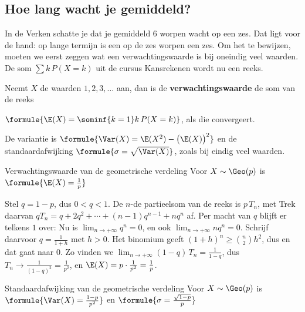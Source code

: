 \begin{oefeningen}
\end{oefeningen}

\subsection{Hoe lang wacht je gemiddeld?}

In de Verken schatte je dat je gemiddeld 6 worpen wacht op een zes. Dat ligt voor de hand: op lange termijn is een op de zes worpen een zes. Om het te bewijzen, moeten we eerst zeggen wat een verwachtingswaarde is bij oneindig veel waarden. De som $\sum k\, P(X = k)$ uit de cursus Kansrekenen wordt nu een reeks.

\begin{theorie}
Neemt $X$ de waarden $1, 2, 3, \ldots$ aan, dan is de \textbf{\textcolor{accent}{verwachtingswaarde}} de som van de reeks

\vspace{1mm}
\qquad $\formule{\E(X) = \sominf{k=1} k\, P(X = k)}$, \qquad als die convergeert.

\vspace{1mm}
De variantie is $\formule{\Var(X) = \E(X^2) - \bigl(\E(X)\bigr)^2}$ en de standaardafwijking $\formule{\sigma = \sqrt{\Var(X)}}$, zoals bij eindig veel waarden.

\begin{stelling}{Verwachtingswaarde van de geometrische verdeling}
Voor $X \sim \Geo(p)$ is \quad $\formule{\E(X) = \frac1p}$
\end{stelling}

\begin{bewijs}
Stel $q = 1 - p$, dus $0 < q < 1$. De $n$-de partieelsom van de reeks is $p\,T_n$, met
Trek daarvan $qT_n = q + 2q^2 + \cdots + (n - 1)q^{n-1} + nq^n$ af. Per macht van $q$ blijft er telkens $1$ over:
Nu is $\lim_{n\to+\infty} q^n = 0$, en ook $\lim_{n\to+\infty} nq^n = 0$. Schrijf daarvoor $q = \frac{1}{1 + h}$ met $h > 0$. Het binomium geeft $(1 + h)^n \geqslant \binom{n}{2}h^2$, dus
en dat gaat naar 0. Zo vinden we $\lim_{n\to+\infty} (1 - q)\,T_n = \frac{1}{1 - q}$, dus $T_n \to \frac{1}{(1 - q)^2} = \frac{1}{p^2}$, en $\E(X) = p \cdot \frac{1}{p^2} = \frac1p$.
\end{bewijs}

\begin{stelling}{Standaardafwijking van de geometrische verdeling}
Voor $X \sim \Geo(p)$ is \quad $\formule{\Var(X) = \frac{1 - p}{p^2}}$ \quad en \quad $\formule{\sigma = \frac{\sqrt{1 - p}}{p}}$
\end{stelling}
\end{theorie}

